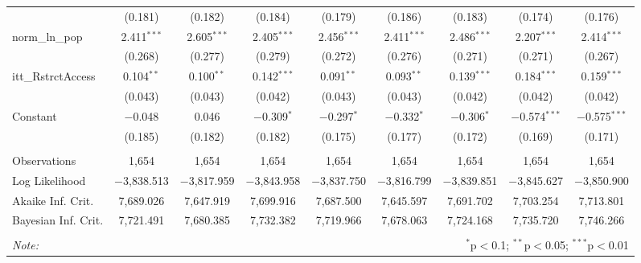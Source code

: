 \begin{sidewaystable}[!htbp]
\begin{tabular}{@{\extracolsep{5pt}}lcccccccc}
  & (0.181) & (0.182) & (0.184) & (0.179) & (0.186) & (0.183) & (0.174) & (0.176) \\ 
  norm\_ln\_pop & 2.411$^{***}$ & 2.605$^{***}$ & 2.405$^{***}$ & 2.456$^{***}$ & 2.411$^{***}$ & 2.486$^{***}$ & 2.207$^{***}$ & 2.414$^{***}$ \\ 
  & (0.268) & (0.277) & (0.279) & (0.272) & (0.276) & (0.271) & (0.271) & (0.267) \\ 
  itt\_RstrctAccess & 0.104$^{**}$ & 0.100$^{**}$ & 0.142$^{***}$ & 0.091$^{**}$ & 0.093$^{**}$ & 0.139$^{***}$ & 0.184$^{***}$ & 0.159$^{***}$ \\ 
  & (0.043) & (0.043) & (0.042) & (0.043) & (0.043) & (0.042) & (0.042) & (0.042) \\ 
  Constant & $-$0.048 & 0.046 & $-$0.309$^{*}$ & $-$0.297$^{*}$ & $-$0.332$^{*}$ & $-$0.306$^{*}$ & $-$0.574$^{***}$ & $-$0.575$^{***}$ \\ 
  & (0.185) & (0.182) & (0.182) & (0.175) & (0.177) & (0.172) & (0.169) & (0.171) \\ 
 \hline \\[-1.8ex] 
Observations & 1,654 & 1,654 & 1,654 & 1,654 & 1,654 & 1,654 & 1,654 & 1,654 \\ 
Log Likelihood & $-$3,838.513 & $-$3,817.959 & $-$3,843.958 & $-$3,837.750 & $-$3,816.799 & $-$3,839.851 & $-$3,845.627 & $-$3,850.900 \\ 
Akaike Inf. Crit. & 7,689.026 & 7,647.919 & 7,699.916 & 7,687.500 & 7,645.597 & 7,691.702 & 7,703.254 & 7,713.801 \\ 
Bayesian Inf. Crit. & 7,721.491 & 7,680.385 & 7,732.382 & 7,719.966 & 7,678.063 & 7,724.168 & 7,735.720 & 7,746.266 \\ 
\hline 
\hline \\[-1.8ex] 
\textit{Note:}  & \multicolumn{8}{r}{$^{*}$p$<$0.1; $^{**}$p$<$0.05; $^{***}$p$<$0.01} \\ 
\end{tabular} 
\end{sidewaystable} 
